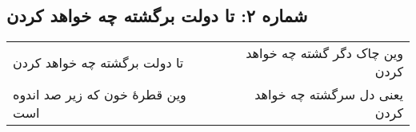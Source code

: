 \begin{center}
\section*{شماره ۲: تا دولت برگشته چه خواهد کردن}
\label{sec:002}
\begin{longtable}{l p{0.5cm} r}
تا دولت برگشته چه خواهد کردن
&&
وین چاک دگر گشته چه خواهد کردن
\\
وین قطرهٔ خون که زیر صد اندوه است
&&
یعنی دل سرگشته چه خواهد کردن
\\
\end{longtable}
\end{center}
